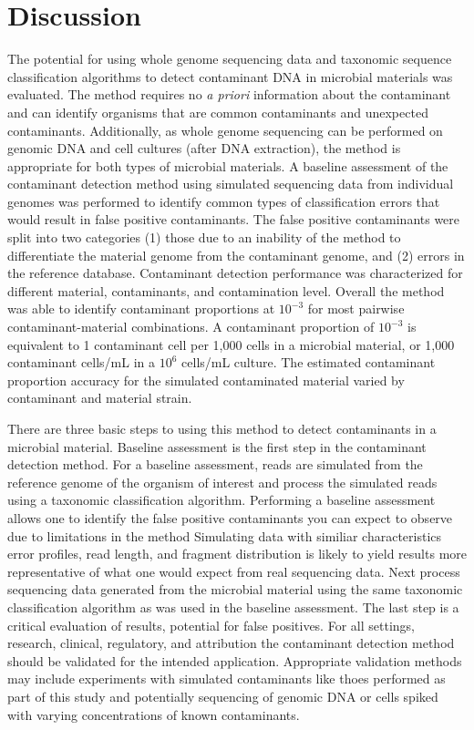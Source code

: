 \documentclass[fleqn,10pt,lineno]{wlpeerj}\usepackage[]{graphicx}\usepackage[]{color}
\begin{document}
\section*{Discussion}

The potential for using whole genome sequencing data and taxonomic sequence classification algorithms to detect contaminant DNA in microbial materials was evaluated.
The method requires no \textit{a priori} information about the contaminant and can identify organisms that are common contaminants and unexpected contaminants.
Additionally, as whole genome sequencing can be performed on genomic DNA and cell cultures (after DNA extraction), the method is appropriate for both types of microbial materials.
A baseline assessment of the contaminant detection method using simulated sequencing data from individual genomes was performed to identify common types of classification errors that would result in false positive contaminants.
The false positive contaminants were split into two categories (1) those due to an inability of the method to differentiate the material genome from the contaminant genome, and (2) errors in the reference database.
Contaminant detection performance was characterized for different material, contaminants, and contamination level.
Overall the method was able to identify contaminant proportions at $10^{-3}$ for most pairwise contaminant-material combinations.
A contaminant proportion of $10^{-3}$ is equivalent to 1 contaminant cell per 1,000 cells in a microbial material, or 1,000 contaminant cells/mL in a $10^{6}$ cells/mL culture.
The estimated contaminant proportion accuracy for the simulated contaminated material varied by contaminant and material strain.

There are three basic steps to using this method to detect contaminants in a microbial material. 
Baseline assessment is the first step in the contaminant detection method. 
For a baseline assessment, reads are simulated from the reference genome of the organism of interest and process the simulated reads using a taxonomic classification algorithm. 
Performing a baseline assessment allows one to identify the false positive contaminants you can expect to observe due to limitations in the method
Simulating data with similiar characteristics error profiles, read length, and fragment distribution is likely to yield results more representative of what one would expect from real sequencing data.
Next process sequencing data generated from the microbial material using the same taxonomic classification algorithm as was used in the baseline assessment. 
The last step is a critical evaluation of results, potential for false positives. 
For all settings, research, clinical, regulatory, and attribution the contaminant detection method should be validated for the intended application.
Appropriate validation methods may include experiments with simulated contaminants like thoes performed as part of this study and potentially sequencing of genomic DNA or cells spiked with varying concentrations of known contaminants.
\end{document}
